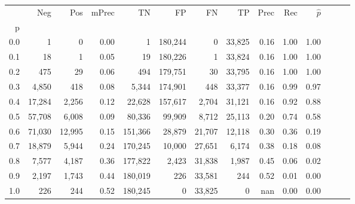 \begin{tabular}{rrrrrrrrrrrrrr}
\toprule
{} &     Neg &     Pos & mPrec &       TN &       FP &      FN &      TP &  Prec &   Rec & $\hat{p}$ \\
p   &         &         &       &          &          &         &         &       &       &           \\
\midrule
0.0 &       1 &       0 &  0.00 &        1 &  180,244 &       0 &  33,825 &  0.16 &  1.00 &      1.00 \\
0.1 &      18 &       1 &  0.05 &       19 &  180,226 &       1 &  33,824 &  0.16 &  1.00 &      1.00 \\
0.2 &     475 &      29 &  0.06 &      494 &  179,751 &      30 &  33,795 &  0.16 &  1.00 &      1.00 \\
0.3 &   4,850 &     418 &  0.08 &    5,344 &  174,901 &     448 &  33,377 &  0.16 &  0.99 &      0.97 \\
0.4 &  17,284 &   2,256 &  0.12 &   22,628 &  157,617 &   2,704 &  31,121 &  0.16 &  0.92 &      0.88 \\
0.5 &  57,708 &   6,008 &  0.09 &   80,336 &   99,909 &   8,712 &  25,113 &  0.20 &  0.74 &      0.58 \\
0.6 &  71,030 &  12,995 &  0.15 &  151,366 &   28,879 &  21,707 &  12,118 &  0.30 &  0.36 &      0.19 \\
0.7 &  18,879 &   5,944 &  0.24 &  170,245 &   10,000 &  27,651 &   6,174 &  0.38 &  0.18 &      0.08 \\
0.8 &   7,577 &   4,187 &  0.36 &  177,822 &    2,423 &  31,838 &   1,987 &  0.45 &  0.06 &      0.02 \\
0.9 &   2,197 &   1,743 &  0.44 &  180,019 &      226 &  33,581 &     244 &  0.52 &  0.01 &      0.00 \\
1.0 &     226 &     244 &  0.52 &  180,245 &        0 &  33,825 &       0 &   nan &  0.00 &      0.00 \\
\bottomrule
\end{tabular}
